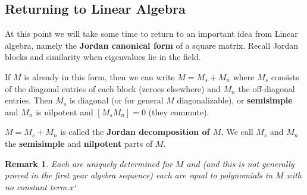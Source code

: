 \documentclass[12pt]{article}
\theoremstyle{nonumberbreak}
\theoremstyle{changebreak}
\theoremstyle{nonumberbreak}
\theoremstyle{change}
\newtheorem{rmk}[thm]{Remark}
\begin{document}
\subsection{Returning to Linear Algebra}
At this point we will take some time to return to an important idea from Linear algebra, namely the \textbf{Jordan canonical form}
of a square matrix. Recall Jordan blocks and similarity when eigenvalues lie in the field.

If $M$ is already in this form, then we can write $M=M_s+M_n$ where $M_s$ consists of the diagonal entries of each
block (zeroes elsewhere) and $M_n$ the off-diagonal entries. Then $M_s$ is diagonal (or for general $M$
diagonalizable), or \textbf{semisimple} and $M_n$ is nilpotent and $[M_sM_n]=0$ (they commute).

\begin{defn}
	$M=M_s+M_n$ is called the \textbf{Jordan decomposition of $M$.} We call $M_s$ and $M_n$ the \textbf{semisimple} 
	and \textbf{nilpotent} parts of $M$.
\end{defn}
\begin{rmk}
	Each are uniquely determined for $M$ and (and this is not generally proved in the first year 
	algebra sequence) each are equal to polynomials in $M$ with no constant term.x`
\end{rmk}
\end{document}
